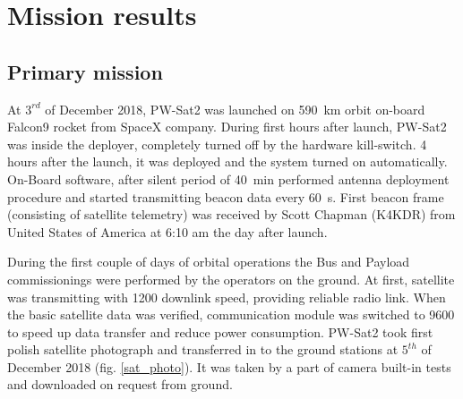 \chapter{Mission results}

\section{Primary mission}
At $3^{rd}$ of December 2018, PW-Sat2 was launched on \SI{590}{\kilo\meter} orbit on-board Falcon9 rocket from SpaceX company. During first hours after launch, PW-Sat2 was inside the deployer, completely turned off by the hardware kill-switch. 4 hours after the launch, it was deployed and the system turned on automatically. On-Board software, after silent period of \SI{40}{\minute} performed antenna deployment procedure and started transmitting beacon data every \SI{60}{\second}. First beacon frame (consisting of satellite telemetry) was received by Scott Chapman (K4KDR) from United States of America at 6:10 am the day after launch. 

During the first couple of days of orbital operations the Bus and Payload commissionings were performed by the operators on the ground. At first, satellite was transmitting with \SI{1200}{\bps} downlink speed, providing reliable radio link. When the basic satellite data was verified, communication module was switched to \SI{9600}{\bps} to speed up data transfer and reduce power consumption. PW-Sat2 took first polish satellite photograph and transferred in to the ground stations at $5^{th}$ of December 2018 (fig. \ref{sat_photo}). It was taken by a part of camera built-in tests and downloaded on request from ground.

